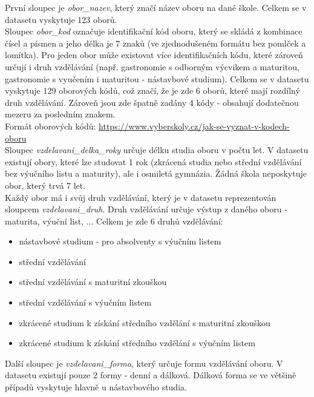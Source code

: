 \documentclass[12pt, a4paper]{article}
\begin{document}
První sloupec je \textit{obor\_nazev}, který značí název oboru na dané škole. Celkem se v datasetu vyskytuje 123 oborů.\\

Sloupec \textit{obor\_kod} označuje identifikační kód oboru, který se skládá z kombinace čísel a písmen a jeho délka je 7 znaků (ve zjednodušeném formátu bez pomlček a lomítka). Pro jeden obor může existovat více identifikačních kódu, které zároveň určují i druh vzdělávání  (např. gastronomie s odborným výcvikem a maturitou, gastronomie s vyučením i maturitou - nástavbové studium). Celkem se v datasetu vyskytuje 129 oborových kódů, což značí, že je zde 6 oborů, které mají rozdílný druh vzdělávání. Zároveň jsou zde špatně zadány 4 kódy - obsahují dodatečnou mezeru za posledním znakem. \\
\noindent Formát oborových kódů: \href{https://www.vyberskoly.cz/jak-se-vyznat-v-kodech-oboru}{https://www.vyberskoly.cz/jak-se-vyznat-v-kodech-oboru} \\

Sloupec \textit{vzdelavani\_delka\_roky} určuje délku studia oboru v počtu let. V datasetu existují obory, které lze studovat 1 rok (zkrácená studia nebo střední vzdělávání bez výučního listu a maturity), ale i osmiletá gymnázia. Žádná škola neposkytuje obor, který trvá 7 let. \\

Každý obor má i svůj druh vzdělávání, který je v datasetu reprezentován sloupcem \textit{vzdelavani\_druh}. Druh vzdělávání určuje výstup z daného oboru - maturita, výuční list, ... Celkem je zde 6 druhů vzdělávání:
\begin{itemize}
\item nástavbové studium - pro absolventy s výučním listem
\item střední vzdělávání
\item střední vzdělávání s maturitní zkouškou
\item střední vzdělávání s výučním listem
\item zkrácené studium k získání středního vzdělání s maturitní zkouškou
\item zkrácené studium k získání středního vzdělání s výučním listem\\
\end{itemize}

Další sloupec je \textit{vzdelavani\_forma}, který určuje formu vzdělávání oboru. V datasetu existují pouze 2 formy - denní a dálková. Dálková forma se ve většině případů vyskytuje hlavně u nástavbového studia. \\
\end{document}
